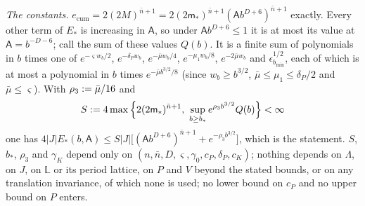\emph{The constants.} $e_{\mathrm{cum}}=2(2M)^{\bar n+1}=2(2\mathsf m_*)^{\bar n+1}(\mathsf Ab^{D+6})^{\bar n+1}$ exactly. Every other term of $E_*$ is increasing in $\mathsf A$, so under $\mathsf Ab^{D+6}\le1$ it is at most its value at $\mathsf A=b^{-D-6}$; call the sum of these values $Q(b)$. It is a finite sum of polynomials in $b$ times one of $e^{-\varsigma w_b/2}$, $e^{-\delta_Pw_b}$, $e^{-\bar\mu w_b/4}$, $e^{-\mu_1w_b/8}$, $e^{-2\bar\mu w_b}$ and $\epsilon_{b_{\min}}^{1/2}$, each of which is at most a polynomial in $b$ times $e^{-\bar\mu b^{3/2}/8}$ (since $w_b\ge b^{3/2}$, $\bar\mu\le\mu_1\le\delta_P/2$ and $\bar\mu\le\varsigma$). With $\rho_3:=\bar\mu/16$ and
\[
S\defeq4\max\Big\{2(2\mathsf m_*)^{\bar n+1},\ \sup_{b\ge b_*}e^{\rho_3b^{3/2}}Q(b)\Big\}<\infty
\]
one has $4|J|E_*(b,\mathsf A)\le S|J|\big[(\mathsf Ab^{D+6})^{\bar n+1}+e^{-\rho_3b^{3/2}}\big]$, which is the statement. $S$, $b_*$, $\rho_3$ and $\gamma_K$ depend only on $(n,\bar n,D,\varsigma,\gamma_0,c_P,\delta_P,c_K)$; nothing depends on $\Lambda$, on $J$, on $\mathbb{L}$ or its period lattice, on $P$ and $V$ beyond the stated bounds, or on any translation invariance, of which none is used; no lower bound on $c_P$ and no upper bound on $P$ enters.
